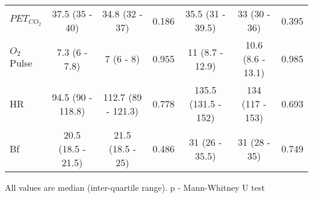 \begin{sidewaystable}[hp]
\begin{tabular}{l | c c c | c c c}
		$PET_{CO_2}$                    & 37.5 (35 - 40)      & 34.8 (32 - 37)     & 0.186 & 35.5 (31 - 39.5)    & 33 (30 - 36)       & 0.395 \\
		$O_2$Pulse                   & 7.3 (6 - 7.8)       & 7 (6 - 8)          & 0.955 & 11 (8.7 - 12.9)     & 10.6 (8.6 - 13.1)  & 0.985 \\
		HR                  & 94.5 (90 - 118.8)   & 112.7 (89 - 121.3) & 0.778 & 135.5 (131.5 - 152) & 134 (117 - 153)    & 0.693 \\
		Bf          & 20.5 (18.5 - 21.5)  & 21.5 (18.5 - 25)   & 0.486 & 31 (26 - 35.5)      & 31 (28 - 35)       & 0.749 \\ \hline
	\end{tabular}
	
		All values are median (inter-quartile range). p - Mann-Whitney U test
\end{sidewaystable}

